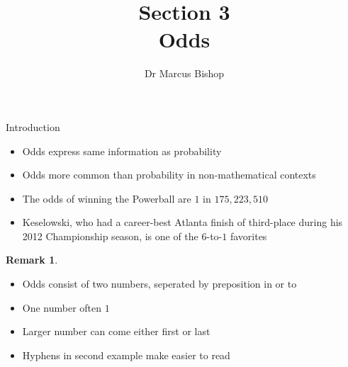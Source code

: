 \documentclass[handout]{beamer}
\title[\S3]{Section 3\\Odds}
\author{Dr Marcus Bishop}
\theoremstyle{definition}
\newtheorem{remark}{Remark}
\begin{document}
\begin{frame}\titlepage\end{frame}
\LogoOff

\begin{frame}{Introduction}
\begin{itemize}
\item \alert{Odds} express same information as probability
\item Odds more common than probability in non-mathematical contexts
\end{itemize}
\begin{example}
\begin{itemize}
\item The odds of winning the Powerball are \alert{$1$ in $175,223,510$}
\item Keselowski, who had a career-best Atlanta finish of third-place
during his 2012 Championship season, is one of the \alert{$6$-to-$1$} favorites
\end{itemize}
\end{example}
\begin{remark}
\begin{itemize}
\item Odds consist of two numbers, seperated by preposition \alert{in} or \alert{to}
\item One number often $1$
\item Larger number can come either first or last
\item Hyphens in second example make easier to read
\end{itemize}
\end{remark}
\end{frame}
\end{document}
